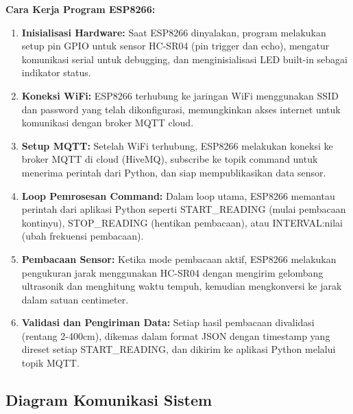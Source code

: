 \documentclass[a4paper,10pt]{article}
\begin{document}
\textbf{Cara Kerja Program ESP8266:}
\begin{enumerate}
\item \textbf{Inisialisasi Hardware:} Saat ESP8266 dinyalakan, program melakukan setup pin GPIO untuk sensor HC-SR04 (pin trigger dan echo), mengatur komunikasi serial untuk debugging, dan menginisialisasi LED built-in sebagai indikator status.

\item \textbf{Koneksi WiFi:} ESP8266 terhubung ke jaringan WiFi menggunakan SSID dan password yang telah dikonfigurasi, memungkinkan akses internet untuk komunikasi dengan broker MQTT cloud.

\item \textbf{Setup MQTT:} Setelah WiFi terhubung, ESP8266 melakukan koneksi ke broker MQTT di cloud (HiveMQ), subscribe ke topik command untuk menerima perintah dari Python, dan siap mempublikasikan data sensor.

\item \textbf{Loop Pemrosesan Command:} Dalam loop utama, ESP8266 memantau perintah dari aplikasi Python seperti START\_READING (mulai pembacaan kontinyu), STOP\_READING (hentikan pembacaan), atau INTERVAL:nilai (ubah frekuensi pembacaan).

\item \textbf{Pembacaan Sensor:} Ketika mode pembacaan aktif, ESP8266 melakukan pengukuran jarak menggunakan HC-SR04 dengan mengirim gelombang ultrasonik dan menghitung waktu tempuh, kemudian mengkonversi ke jarak dalam satuan centimeter.

\item \textbf{Validasi dan Pengiriman Data:} Setiap hasil pembacaan divalidasi (rentang 2-400cm), dikemas dalam format JSON dengan timestamp yang direset setiap START\_READING, dan dikirim ke aplikasi Python melalui topik MQTT.
\end{enumerate}

\newpage

\subsection{Diagram Komunikasi Sistem}
\end{document}
